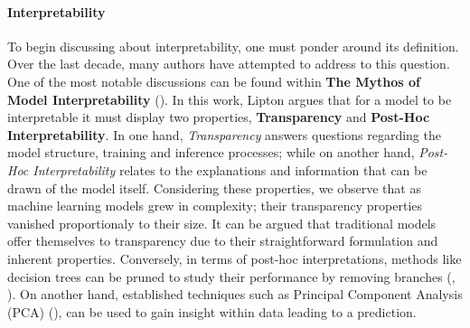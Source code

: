 \paragraph{Interpretability}
To begin discussing about interpretability, one must ponder around its definition. 
Over the last decade, many authors have attempted to address to this question. One 
of the most notable discussions can be found within \textbf{The Mythos of Model Interpretability} 
(\cite{mythos_interp}). In this work, Lipton argues that for a model to be interpretable it must display 
two properties, \textbf{Transparency} and \textbf{Post-Hoc Interpretability}. In one hand, 
\textit{Transparency} answers questions regarding the model structure, training and inference 
processes; while on another hand, \textit{Post-Hoc Interpretability} relates to the explanations 
and information that can be drawn of the model itself.
\noindent Considering these properties, we observe that as machine learning models grew in complexity; 
their transparency properties vanished  
proportionaly to their size. It can be argued that traditional models offer themselves to  
transparency due to their straightforward formulation and inherent properties. Conversely, 
in terms of post-hoc interpretations, methods like decision trees \cite{breiman2017classification} 
can be pruned to study their performance by removing branches (\cite{lakkaraju2016interpretable},
\cite{mothilal2020explaining}). 
On another hand, established techniques such as Principal Component Analysis (PCA) 
(\cite{wold1987principal}), can be used to gain insight within data leading to a prediction.\\

